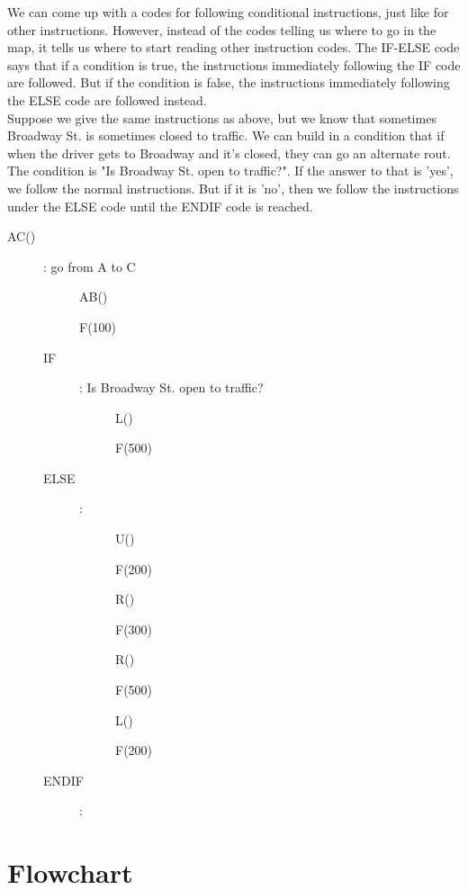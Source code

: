 We can come up with a codes for following conditional instructions, just like for other instructions. However, instead of the codes telling us where to go in the map, it tells us where to start reading other instruction codes. The IF-ELSE code says that if a condition is true, the instructions immediately following the IF code are followed. But if the condition is false, the instructions immediately following the ELSE code are followed instead.\\

Suppose we give the same instructions as above, but we know that sometimes Broadway St. is sometimes closed to traffic. We can build in a condition that if when the driver gets to Broadway and it's closed, they can go an alternate rout. The condition is "Is Broadway St. open to traffic?". If the answer to that is 'yes', we follow the normal instructions. But if it is 'no', then we follow the instructions under the ELSE code until the ENDIF code is reached. \\

\begin{description}
	\item[AC()] : go from A to C
	\begin{description}
		\item[] AB()
		\item[] F(100)
		\item[IF]: Is Broadway St. open to traffic?
		\begin{description}
			\item[] L()
			\item[] F(500)
		\end{description}
		\item[ELSE]:
		\begin{description}
			\item[] U()
			\item[] F(200)
			\item[] R()
			\item[] F(300)
			\item[] R()
			\item[] F(500)
			\item[] L()
			\item[] F(200)
		\end{description}
		\item[ENDIF]:
	\end{description}
\end{description}

\section{Flowchart}

